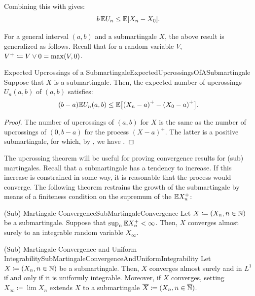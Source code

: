 Combining this with  gives:
\begin{equation}\label{eq:ExpectedUpcrossingsSpecialCase}
	b \, \mathbb{E} U_n \le \mathbb{E}[X_n - X_0].
\end{equation}


For a general interval \((a, b)\) and a submartingale \(X\), the above result is generalized as follows. Recall that for a random variable \(V\), \(V^{+} \coloneqq V \lor 0 = \max(V, 0)\).


\begin{thm}{Expected Upcrossings of a Submartingale}{ExpectedUpcrossingsOfASubmartingale}
	Suppose that \(X\) is a submartingale. Then, the expected number of upcrossings \(U_n(a, b)\) of \((a, b)\) satisfies:
	\begin{equation}\label{eq:UpcrossingsInequality}
		(b - a) \mathbb{E} U_n(a, b) \le \mathbb{E}\bigl[{(X_n - a)}^{+} - {(X_0 - a)}^{+}\bigr].
	\end{equation}
\end{thm}

\begin{proof}
	The number of upcrossings of \((a, b)\) for \(X\) is the same as the number of upcrossings of \((0, b - a)\) for the process \({(X - a)}^{+}\). The latter is a positive submartingale, for which, by , we have .
\end{proof}

The upcrossing theorem will be useful for proving convergence results for (sub) martingales.
Recall that a submartingale has a tendency to increase.
If this increase is constrained in some way, it is reasonable that the process would converge.
The following theorem restrains the growth of the submartingale by means of a finiteness condition on the supremum of the \(\mathbb{E} X_n^{+}\):

\begin{thm}{(Sub) Martingale Convergence}{SubMartingaleConvergence}
	Let \(X \coloneqq (X_n, n \in \mathbb{N})\) be a submartingale. Suppose that \(\sup_n \mathbb{E} X_n^+ < \infty\). Then, \(X\) converges almost surely to an integrable random variable \(X_\infty\).
\end{thm}

\begin{thm}{(Sub) Martingale Convergence and Uniform Integrability}{SubMartingaleConvergenceAndUniformIntegrability}
	Let \(X \coloneqq (X_n, n \in \mathbb{N})\) be a submartingale. Then, \(X\) converges almost surely and in \(L^1\) if and only if it is uniformly integrable. Moreover, if \(X\) converges, setting \(X_\infty \coloneqq \lim X_n\) extends \(X\) to a submartingale \(\overline{X} \coloneqq (X_n, n \in \overline{\mathbb{N}})\).
\end{thm}

